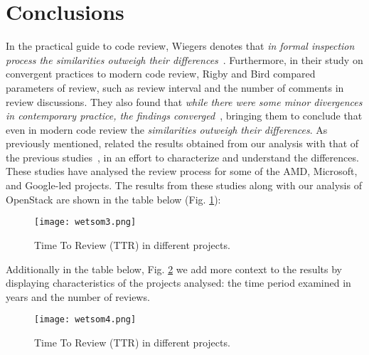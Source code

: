 \documentclass[10pt, conference]{IEEEtran}
\begin{document}
\section{Conclusions}

In the practical guide to code review, Wiegers denotes that \emph{in formal inspection 
process the similarities outweigh their differences}~\cite{bib21}.
Furthermore, in their study on convergent practices to modern code review, Rigby and Bird 
compared parameters of review, such as review interval and the number of comments in 
review discussions. They also found that \emph{while there were some minor divergences in contemporary
practice, the findings converged}~\cite{bib13}, bringing them to conclude that even in modern code review 
the \emph{similarities outweigh their differences}.  
As previously mentioned, related the results obtained from our analysis with 
that of the previous studies~\cite{bib13,bib22}, 
in an effort to characterize and understand the differences. These
studies have analysed the review process for some of
the AMD, Microsoft, and Google-led projects. The results from these studies 
along with our analysis of OpenStack are shown in the table below (Fig. \ref{fig:3}):

\begin{figure}[H]
\centering

\texttt{[image: wetsom3.png]}

\caption{Time To Review (TTR) in  different projects.}
\label{fig:3}
\end{figure}


Additionally in the table below, Fig. \ref{fig:4} we add more context to the results by 
displaying characteristics of the projects analysed: the time period examined in years 
and the number of reviews.

\begin{figure}[H]
\centering

\texttt{[image: wetsom4.png]}

\caption{Time To Review (TTR) in  different projects.}
\label{fig:4}
\end{figure}
\end{document}
